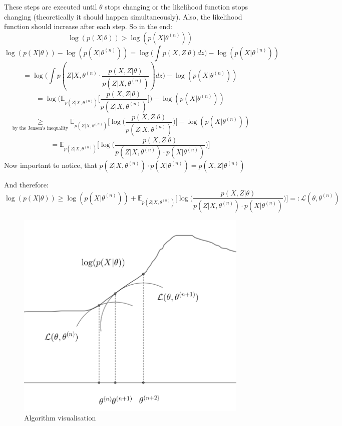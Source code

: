 These steps are executed until $\theta$ stops changing or the likelihood function stops changing (theoretically it should happen simultaneously). 
Also, the likelihood function should increase after each step. So in the end:
\[\log(p(X|\theta)) > \log(p(X|\theta^{(n)}))\]
\[\log(p(X|\theta)) - \log(p(X|\theta^{(n)})) 
= \log \Big( \int p(X,Z|\theta) dz \Big) - \log(p(X|\theta^{(n)})) \]
\[= \log \Big(\int p(Z|X,\theta^{(n)} \cdot \displaystyle \frac{p(X,Z|\theta)}{p(Z|X,\theta^{(n)})}) dz \Big) - \log(p(X|\theta^{(n)}))\]
\[= \log\Big( \mathbb{E}_{p(Z|X,\theta^{(n)})}\big[\displaystyle\frac{p(X,Z|\theta)}{p(Z|X,\theta^{(n)})} \big] \Big) - \log(p(X|\theta^{(n)})) \]
\[ \underset{\text{by the Jensen's inequality}}{\geq} \mathbb{E}_{p(Z|X,\theta^{(n)})}\Big[\log\big(\displaystyle\frac{p(X,Z|\theta)}{p(Z|X,\theta^{(n)})} \big) \Big]  - \log(p(X|\theta^{(n)})) \]
\[ = \mathbb{E}_{p(Z|X,\theta^{(n)})}\Big[\log\big(\displaystyle\frac{p(X,Z|\theta)}{p(Z|X,\theta^{(n)}) \cdot p(X|\theta^{(n)})} \big) \Big]\]
Now important to notice, that $p(Z|X,\theta^{(n)}) \cdot p(X|\theta^{(n)}) = p(X,Z|\theta^{(n)})$

\noindent And therefore:
\[ \log(p(X|\theta)) \geq \log(p(X|\theta^{(n)})) + \mathbb{E}_{p(Z|X,\theta^{(n)})}\Big[\log\big(\displaystyle\frac{p(X,Z|\theta)}{p(Z|X,\theta^{(n)}) \cdot p(X|\theta^{(n)})} \big) \Big] =: \mathcal{L}(\theta, \theta^{(n)})\]

\begin{figure}[h]
    \begin{center}
        \includegraphics[scale=0.45]{src/Design/assets/em_visualisation.png}
    \end{center}
    \caption{Algorithm visualisation}
\end{figure}

